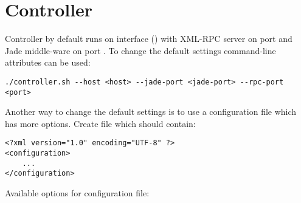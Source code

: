 \section{Controller}
Controller by default runs on  interface () with XML-RPC server on port  and Jade middle-ware on port . To change the default settings command-line attributes can be used:
\begin{verbatim}
./controller.sh --host <host> --jade-port <jade-port> --rpc-port <port>
\end{verbatim}
Another way to change the default settings is to use a configuration file which has more options. Create file  which should contain:
\begin{verbatim}
<?xml version="1.0" encoding="UTF-8" ?>
<configuration>
    ...
</configuration>
\end{verbatim}
Available options for configuration file:
